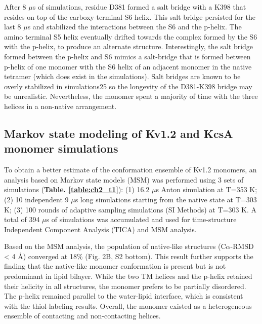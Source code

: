 After 8 $\mu$s of simulations, residue D381 formed a salt bridge with a K398 that resides on top of the carboxy-terminal S6 helix. This salt bridge persisted for the last 8 $\mu$s and stabilized the interactions between the S6 and the p-helix. The amino terminal S5 helix eventually drifted towards the complex formed by the S6 with the p-helix, to produce an alternate structure. Interestingly, the salt bridge formed between the p-helix and S6 mimics a salt-bridge that is formed between p-helix of one monomer with the S6 helix of an adjacent monomer in the native tetramer (which does exist in the simulations). Salt bridges are known to be overly stabilized in simulations25 so the longevity of the D381-K398 bridge may be unrealistic. Nevertheless, the monomer spent a majority of time with the three helices in a non-native arrangement.

\subsection{Markov state modeling of Kv1.2 and KcsA monomer simulations}
To obtain a better estimate of the conformation ensemble of Kv1.2 monomers, an analysis based on Markov state models (MSM) was performed using 3 sets of simulations (\textbf{Table. \ref{table:ch2_t1}}): (1) 16.2 $\mu$s Anton simulation at T=353 K; (2) 10 independent 9 $\mu$s long simulations starting from the native state at T=303 K; (3) 100 rounds of adaptive sampling simulations (SI Methods) at T=303 K. A total of 394 $\mu$s of simulations was accumulated and used for time-structure Independent Component Analysis (TICA) and MSM analysis. \citep{molgedey1994, noe2015, noe2016, perezHernandez2013, schwantes2013}

Based on the MSM analysis, the population of native-like structures (C$\alpha$-RMSD < 4 Å) converged at 18\% (Fig. 2B, S2 bottom). This result further supports the finding that the native-like monomer conformation is present but is not predominant in lipid bilayer. While the two TM helices and the p-helix retained their helicity in all structures, the monomer prefers to be partially disordered. The p-helix remained parallel to the water-lipid interface, which is consistent with the thiol-labeling results. \citep{gajewski2011} Overall, the monomer existed as a heterogeneous ensemble of contacting and non-contacting helices.

